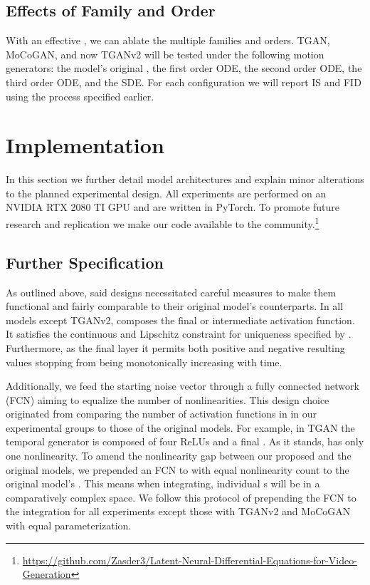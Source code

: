 \documentclass[tablecaption=bottom,pmlr]{jmlr}
\begin{document}
\subsection{Effects of Family and Order}

With an effective , we can ablate the multiple families and orders. TGAN, MoCoGAN, and now TGANv2 will be tested under the following motion generators: the model's original , the first order ODE, the second order ODE, the third order ODE, and the SDE. For each configuration we will report IS and FID using the process specified earlier.

\section{Implementation}

In this section we further detail model architectures and explain minor alterations to the planned experimental design. All experiments are performed on an NVIDIA RTX 2080 TI GPU and are written in PyTorch. To promote future research and replication we make our code available to the community.\footnote{\url{https://github.com/Zasder3/Latent-Neural-Differential-Equations-for-Video-Generation}}

\subsection{Further Specification}

As outlined above, said  designs necessitated careful measures to make them functional and fairly comparable to their original model's counterparts. In all models except TGANv2,  composes the final or intermediate activation function. It satisfies the continuous and Lipschitz constraint for uniqueness specified by \citet{neuralode}. Furthermore, as the final layer it permits both positive and negative resulting values stopping  from being monotonically increasing with time.

Additionally, we feed the starting noise vector through a fully connected network (FCN) aiming to equalize the number of nonlinearities. This design choice originated from comparing the number of activation functions in  in our experimental groups to those of the original models. For example, in TGAN the temporal generator is composed of four ReLUs and a final . As it stands,  has only one nonlinearity. To amend the nonlinearity gap between our proposed  and the original models, we prepended an FCN to  with equal nonlinearity count to the original model's . This means when integrating, individual s will be in a comparatively complex space. We follow this protocol of prepending the FCN to the integration for all experiments except those with TGANv2 and MoCoGAN with equal parameterization. 
\end{document}

